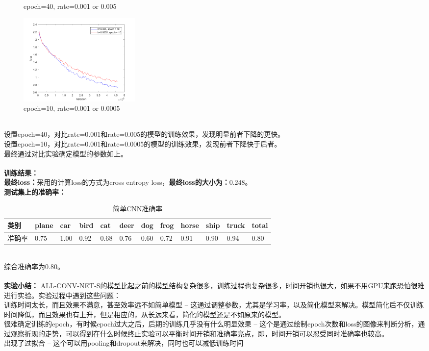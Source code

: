 \documentclass[a4paper,UTF8]{article}
\numberwithin{equation}{section}
\begin{document}
\begin{enumerate}
\begin{figure}[htbp]
\begin{minipage}[t]{0.48\textwidth}
		\caption{epoch=40, rate=0.001 or 0.005}
	\end{minipage}
	\begin{minipage}[t]{0.48\textwidth}
		\centering
		\includegraphics[width=6cm]{acns-001-0005-10.png}
		\caption{epoch=10, rate=0.001 or 0.0005}
	\end{minipage}
\end{figure}\\
设置epoch=40，对比rate=0.001和rate=0.005的模型的训练效果，发现明显前者下降的更快。\\
设置epoch=10，对比rate=0.001和rate=0.0005的模型的训练效果，发现前者下降快于后者。\\
最终通过对比实验确定模型的参数如上。\\\\
\textbf{训练结果：}\\
\textbf{最终loss：}采用的计算loss的方式为cross entropy loss，\textbf{最终loss的大小为：$0.248$}。\\
\textbf{测试集上的准确率：}
\begin{table}[h]
	\centering
	\caption{简单CNN准确率}
	\label{ac1}
	\begin{tabular}{|l|l|l|l|l|l|l|l|l|l|l|l|}
		\hline
		类别	& plane & car & bird & cat & deer & dog & frog & horse & ship & truck & total \\ \hline
		准确率	& 0.75 & 1.00 & 0.92 & 0.68 & 0.76 & 0.60 & 0.72 & 0.91 & 0.90 & 0.94 & 0.80 \\ \hline
	\end{tabular}
\end{table}\\
综合准确率为$0.80$。\\\\
\textbf{实验小结：}
ALL-CONV-NET-S的模型比起之前的模型结构复杂很多，训练过程也复杂很多，时间开销也很大，如果不用GPU来跑恐怕很难进行实验。实验过程中遇到这些问题：\\
训练时间太长，而且效果不满意，甚至效率远不如简单模型 -- 这通过调整参数，尤其是学习率，以及简化模型来解决。模型简化后不仅训练时间降低，而且效果也有上升，但是相应的，从长远来看，简化的模型还是不如原来的模型。\\
很难确定训练的epoch，有时候epoch过大之后，后期的训练几乎没有什么明显效果 -- 这个是通过绘制epoch次数和loss的图像来判断分析，通过观察折现的走势，可以得到在什么时候终止实验可以平衡时间开销和准确率亮点，即，时间开销可以忍受同时准确率也较高。\\
出现了过拟合 -- 这个可以用pooling和dropout来解决，同时也可以减低训练时间\\


\end{enumerate}
\end{document}
